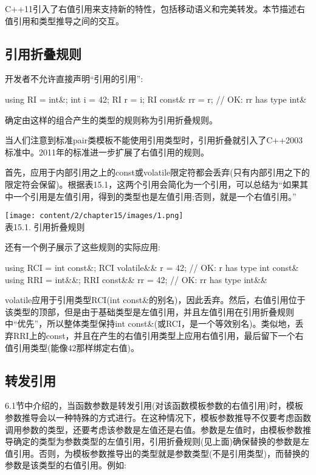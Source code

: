 
C++11引入了右值引用来支持新的特性，包括移动语义和完美转发。本节描述右值引用和类型推导之间的交互。

\subsection{引用折叠规则}

开发者不允许直接声明“引用的引用”:

\begin{cpp}
using RI = int&;
int i = 42;
RI r = i;
RI const& rr = r; // OK: rr has type int&
\end{cpp}

确定由这样的组合产生的类型的规则称为引用折叠规则。

\begin{notice}当人们注意到标准pair类模板不能使用引用类型时，引用折叠就引入了C++2003标准中。2011年的标准进一步扩展了右值引用的规则。
\end{notice}

首先，应用于内部引用之上的const或volatile限定符都会丢弃(只有内部引用之下的限定符会保留)。根据表15.1，这两个引用会简化为一个引用，可以总结为“如果其中一个引用是左值引用，得到的类型也是左值引用;否则，就是一个右值引用。”

\begin{center}
\texttt{[image: content/2/chapter15/images/1.png]} \\
表15.1. 引用折叠规则
\end{center}

还有一个例子展示了这些规则的实际应用:

\begin{cpp}
using RCI = int const&;
RCI volatile&& r = 42; // OK: r has type int const&
using RRI = int&&;
RRI const&& rr = 42; // OK: rr has type int&&
\end{cpp}

volatile应用于引用类型RCI(int const\&的别名)，因此丢弃。然后，右值引用位于该类型的顶部，但是由于基础类型是左值引用，并且左值引用在引用折叠规则中“优先”，所以整体类型保持int const\&(或RCI，是一个等效别名)。类似地，丢弃RRI上的const，并且在产生的右值引用类型上应用右值引用，最后留下一个右值引用类型(能像42那样绑定右值)。

\subsection{转发引用}

6.1节中介绍的，当函数参数是转发引用(对该函数模板参数的右值引用)时，模板参数推导会以一种特殊的方式进行。在这种情况下，模板参数推导不仅要考虑函数调用参数的类型，还要考虑该参数是左值还是右值。参数是左值时，由模板参数推导确定的类型为参数类型的左值引用，引用折叠规则(见上面)确保替换的参数是左值引用。否则，为模板参数推导出的类型就是参数类型(不是引用类型)，而替换的参数是该类型的右值引用。例如:

